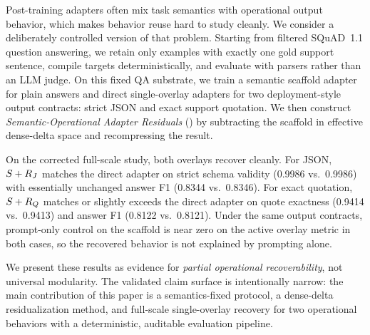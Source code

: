 
Post-training adapters often mix task semantics with operational output behavior, which makes behavior reuse hard to study cleanly. We consider a deliberately controlled version of that problem. Starting from filtered SQuAD~1.1 question answering, we retain only examples with exactly one gold support sentence, compile targets deterministically, and evaluate with parsers rather than an LLM judge. On this fixed QA substrate, we train a semantic scaffold adapter for plain answers and direct single-overlay adapters for two deployment-style output contracts: strict JSON and exact support quotation. We then construct \emph{Semantic-Operational Adapter Residuals} (\method{}) by subtracting the scaffold in effective dense-delta space and recompressing the result.

On the corrected full-scale study, both overlays recover cleanly. For JSON, $S + R_{J}$ matches the direct adapter on strict schema validity (\num{0.9986} vs.\ \num{0.9986}) with essentially unchanged answer F1 (\num{0.8344} vs.\ \num{0.8346}). For exact quotation, $S + R_{Q}$ matches or slightly exceeds the direct adapter on quote exactness (\num{0.9414} vs.\ \num{0.9413}) and answer F1 (\num{0.8122} vs.\ \num{0.8121}). Under the same output contracts, prompt-only control on the scaffold is near zero on the active overlay metric in both cases, so the recovered behavior is not explained by prompting alone.

We present these results as evidence for \emph{partial operational recoverability}, not universal modularity. The validated claim surface is intentionally narrow: the main contribution of this paper is a semantics-fixed protocol, a dense-delta residualization method, and full-scale single-overlay recovery for two operational behaviors with a deterministic, auditable evaluation pipeline.
